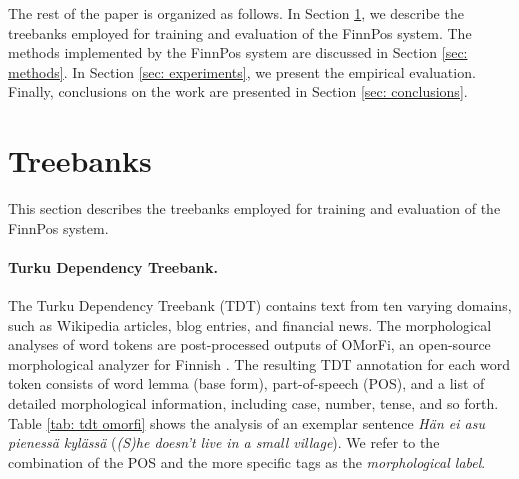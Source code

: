\documentclass[smallextended]{svjour3}       %
\begin{document}
The rest of the paper is organized as follows. In Section \ref{sec: treebanks}, we describe the treebanks employed for training and evaluation of the FinnPos system. The methods implemented by the FinnPos system are discussed in Section \ref{sec: methods}. In Section \ref{sec: experiments}, we present the empirical evaluation. Finally, conclusions on the work are presented in Section \ref{sec: conclusions}. 




\section{Treebanks}
\label{sec: treebanks}

This section describes the treebanks employed for training and evaluation of the FinnPos system. 
\paragraph{Turku Dependency Treebank.}
 
The Turku Dependency Treebank (TDT) \citep{haverinen2009,haverinen2013} contains text from ten varying domains, such as Wikipedia articles, blog entries, and financial news. 
The morphological analyses of word tokens are post-processed outputs of OMorFi, an open-source morphological analyzer for Finnish \citep{pirinen2008}. %
The resulting TDT annotation for each word token consists of word lemma (base form), part-of-speech (POS), and a list of detailed morphological information, including case, number, tense, and so forth. Table \ref{tab: tdt omorfi} shows the analysis of an exemplar sentence \emph{H\"an ei asu pieness\"a kyl\"ass\"a} (\emph{(S)he doesn't live in a small village}). We refer to the combination of the POS and the more specific tags as the \emph{morphological label}. %
\end{document}

